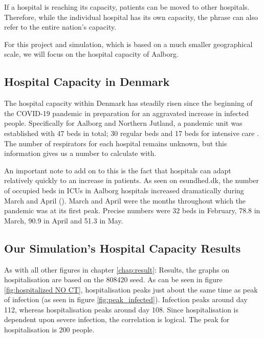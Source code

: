If a hospital is reaching its capacity, patients can be moved to other hospitals. Therefore, while the individual hospital has its own capacity, the phrase  can also refer to the entire nation's capacity.

For this project and simulation, which is based on a much smaller geographical scale, we will focus on the hospital capacity of Aalborg.

\subsection{Hospital Capacity in Denmark}

The hospital capacity within Denmark has steadily risen since the beginning of the COVID-19 pandemic in preparation for an aggravated increase in infected people. Specifically for Aalborg and Northern Jutland, a pandemic unit was established with 47 beds in total; 30 regular beds and 17 beds for intensive care \citep{dansk_sygeplejerad_fra_2020}. The number of respirators for each hospital remains unknown, but this information gives us a number to calculate with.

An important note to add on to this is the fact that hospitals can adapt relatively quickly to an increase in patients. As seen on esundhed.dk, the number of occupied beds in ICUs in Aalborg hospitals increased dramatically during March and April (\cite{esundheddk_sengepladser_2020}). March and April were the months throughout which the pandemic was at its first peak. Precise numbers were 32 beds in February, 78.8 in March, 90.9 in April and 51.3 in May. 

\subsection{Our Simulation's Hospital Capacity Results}

As with all other figures in chapter \ref{chap:result}: Results, the graphs on hospitalisation are based on the 808420 seed. As can be seen in figure \vref{fig:hospitalized NO CT}, hospitalisation peaks just about the same time as peak of infection (as seen in figure \vref{fig:peak_infected}). Infection peaks around day 112, whereas hospitalisation peaks around day 108. Since hospitalisation is dependent upon severe infection, the correlation is logical. The peak for hospitalisation is 200 people.

